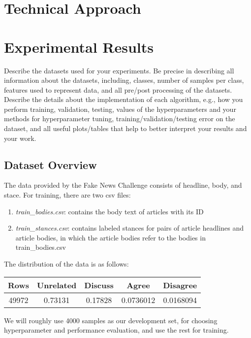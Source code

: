 \documentclass[11.5pt]{article}
\begin{document}
\section{Technical Approach}


\section{Experimental Results}
Describe the datasets used for your experiments. Be precise in describing all information about the datasets, including, classes, number of samples per class, features used to represent data, and all pre/post processing of the datasets.\\
Describe the details about the implementation of each algorithm, e.g., how you perform training, validation, testing, values of the hyperparameters and your methods for hyperparameter tuning, training/validation/testing error on the dataset, and all useful plots/tables that help to better interpret your results and your work.

\subsection{Dataset Overview}

The data provided by the Fake News Challenge consists of 
headline, body, and stace. 
For training, there are two csv files:
\begin{enumerate}
  \item \textit{train\_bodies.csv}: contains the body text of articles with its ID
  \item \textit{train\_stances.csv}: contains labeled stances for pairs of article 
      headlines and article bodies, in which the article bodies refer to the 
      bodies in train\_bodies.csv
\end{enumerate}

The distribution of the data is as follows:
\begin{center}
  \begin{tabular} 
    {|c|c|c|c|c|}
    \hline
    Rows & Unrelated & Discuss & Agree & Disagree \\
    \hline
    49972 & 0.73131 & 0.17828 & 0.0736012 & 0.0168094 \\
    \hline
  \end{tabular}
\end{center}

We will roughly use 4000 samples as our development set, for choosing 
hyperparameter and performance evaluation, and use the rest for training. 
\end{document}
